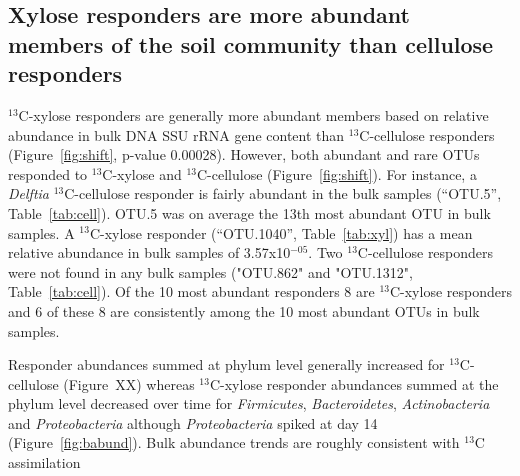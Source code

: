 \subsection{Xylose responders are more abundant members of the soil community
than cellulose responders}
$^{13}$C-xylose responders are generally more abundant members based on
relative abundance in bulk DNA SSU rRNA gene content than $^{13}$C-cellulose
responders (Figure~\ref{fig:shift}, p-value 0.00028).  However, both abundant
and rare OTUs responded to $^{13}$C-xylose and $^{13}$C-cellulose
(Figure~\ref{fig:shift}). For instance, a \textit{Delftia} $^{13}$C-cellulose
responder is fairly abundant in the bulk samples (``OTU.5'',
Table~\ref{tab:cell}). OTU.5 was on average the 13th most abundant OTU in bulk
samples. A $^{13}$C-xylose responder (``OTU.1040'', Table~\ref{tab:xyl}) has a
mean relative abundance in bulk samples of 3.57x10$^{-05}$. Two
$^{13}$C-cellulose responders were not found in any bulk samples ("OTU.862" and
"OTU.1312", Table~\ref{tab:cell}). Of the 10 most abundant responders 8 are
$^{13}$C-xylose responders and 6 of these 8 are consistently among the 10 most
abundant OTUs in bulk samples.

Responder abundances summed at phylum level generally increased for
$^{13}$C-cellulose (Figure~XX) whereas $^{13}$C-xylose responder abundances
summed at the phylum level decreased over time for \textit{Firmicutes},
\textit{Bacteroidetes}, \textit{Actinobacteria} and \textit{Proteobacteria}
although \textit{Proteobacteria} spiked at day 14 (Figure~\ref{fig:babund}).
Bulk abundance trends are roughly consistent with $^{13}$C assimilation

